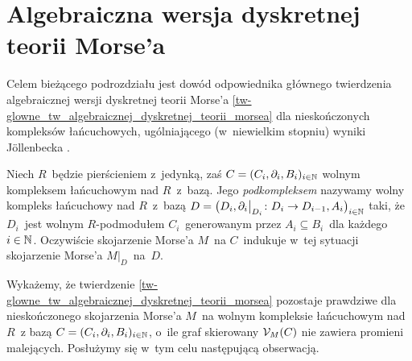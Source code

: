 \section{Algebraiczna wersja dyskretnej teorii Morse'a}\label{homological}
Celem bieżącego podrozdziału jest dowód odpowiednika głównego twierdzenia algebraicznej wersji dyskretnej teorii Morse'a \ref{tw-glowne_tw_algebraicznej_dyskretnej_teorii_morsea} dla nieskończonych kompleksów łańcuchowych, ugólniającego (w~niewielkim stopniu) wyniki J{\"o}llenbecka \cite{Jollenbeck05}. \begin{comment}Twierdzenie to wykorzystujemy w~dowodzie homologicznej wersji wniosków \ref{maincor} oraz \ref{morse-ineq}.
\end{comment}

\begin{comment}
\subsection{Główne twierdzenie dyskretnej teorii Morse'a dla nieskończonych skojarzeń w~wersji algebraicznej}
\end{comment}
Niech $R$~będzie pierścieniem z~jedynką, zaś $C=(C_i,\partial_i,B_i)_{i\in\mathbb{N}}$ wolnym kompleksem łańcuchowym nad $R$~z~bazą. Jego \textit{podkompleksem} nazywamy wolny kompleks łańcuchowy nad $R$~z~bazą \mbox{$D=\bigl(D_i,\partial_i\big|_{D_i}\colon D_i\to D_{i-1}, A_i\bigr)_{i\in\mathbb{N}}$} taki, że $D_i$~jest wolnym $R$-podmodułem $C_i$~generowanym przez $A_i\subseteq B_i$~dla każdego $i\in\mathbb{N}$. Oczywiście skojarzenie Morse'a $M$~na $C$~indukuje w~tej sytuacji skojarzenie Morse'a $M\big|_D$~na~$D$.

Wykażemy, że twierdzenie \ref{tw-glowne_tw_algebraicznej_dyskretnej_teorii_morsea} pozostaje prawdziwe dla nieskończonego skojarzenia Morse'a $M$~na wolnym kompleksie łańcuchowym nad $R$~z bazą $C=(C_i,\partial_i,B_i)_{i\in\mathbb{N}}$, o~ile graf skierowany $\mathcal{V}_M(C)$ nie zawiera promieni malejących. Posłużymy się w~tym celu następującą obserwacją.

